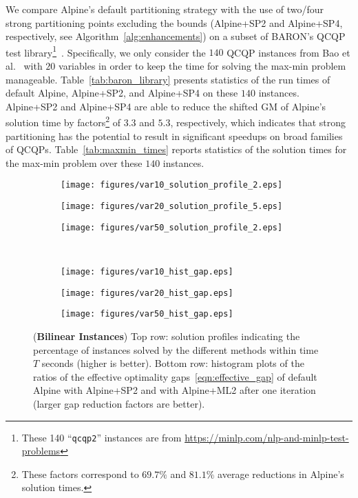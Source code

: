 \documentclass{article}
\newcommand{\pp}{partitioning points}
\begin{document}
We compare Alpine's default partitioning strategy with the use of two/four strong {\pp} excluding the bounds (Alpine+SP2 and Alpine+SP4, respectively, see Algorithm~\ref{alg:enhancements}) on a subset of BARON's QCQP test library\footnote{These 140 ``\texttt{qcqp2}'' instances are from \url{https://minlp.com/nlp-and-minlp-test-problems}}~\cite{bao2011semidefinite}.
Specifically, we only consider the $140$ QCQP instances from Bao et al.\ \cite{bao2011semidefinite} with $20$ variables in order to keep the time for solving the max-min problem manageable.
Table~\ref{tab:baron_library} presents statistics of the run times of default Alpine, Alpine+SP2, and Alpine+SP4 on these $140$ instances.
Alpine+SP2 and Alpine+SP4 are able to reduce the shifted GM of Alpine's solution time by factors\footnote{These factors correspond to $69.7\%$ and $81.1\%$ average reductions in Alpine's solution times.} of $3.3$ and $5.3$, respectively, which indicates that strong partitioning has the potential to result in significant speedups on broad families of QCQPs.
Table~\ref{tab:maxmin_times} reports statistics of the solution times for the max-min problem over these $140$ instances.







\begin{figure}
\centering
\begin{subfigure}[b]{0.33\textwidth}
\texttt{[image: figures/var10\_solution\_profile\_2.eps]}
\end{subfigure}%
\hfill
\begin{subfigure}[b]{0.33\textwidth}
\texttt{[image: figures/var20\_solution\_profile\_5.eps]}
\end{subfigure}%
\hfill
\begin{subfigure}[b]{0.33\textwidth}
\texttt{[image: figures/var50\_solution\_profile\_2.eps]}
\end{subfigure}\\[0.1in]
\begin{subfigure}[b]{0.33\textwidth}
\texttt{[image: figures/var10\_hist\_gap.eps]}
\end{subfigure}%
\hfill
\begin{subfigure}[b]{0.33\textwidth}
\texttt{[image: figures/var20\_hist\_gap.eps]}
\end{subfigure}%
\hfill
\begin{subfigure}[b]{0.33\textwidth}
\texttt{[image: figures/var50\_hist\_gap.eps]}
\end{subfigure}
\caption{
(\textbf{Bilinear Instances}) Top row: solution profiles indicating the percentage of instances solved by the different methods within time $T$ seconds (higher is better). 
Bottom row: histogram plots of the ratios of the effective optimality gaps~\eqref{eqn:effective_gap} of default Alpine with Alpine+SP2 and with Alpine+ML2 after one iteration (larger gap reduction factors are better).}
\label{fig:plots_bilinear}
\end{figure}
\end{document}
